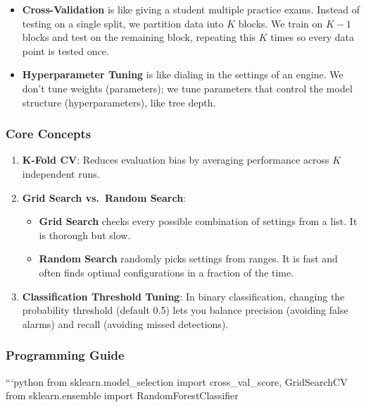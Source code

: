 \begin{itemize}
\tightlist
\item
  \textbf{Cross-Validation} is like giving a student multiple practice
  exams. Instead of testing on a single split, we partition data into
  \(K\) blocks. We train on \(K-1\) blocks and test on the remaining
  block, repeating this \(K\) times so every data point is tested once.
\item
  \textbf{Hyperparameter Tuning} is like dialing in the settings of an
  engine. We don't tune weights (parameters); we tune parameters that
  control the model structure (hyperparameters), like tree depth.
\end{itemize}

\subsubsection{Core Concepts}\label{core-concepts-4}

\begin{enumerate}
\def\labelenumi{\arabic{enumi}.}
\tightlist
\item
  \textbf{K-Fold CV}: Reduces evaluation bias by averaging performance
  across \(K\) independent runs.
\item
  \textbf{Grid Search vs.~Random Search}:

  \begin{itemize}
  \tightlist
  \item
    \textbf{Grid Search} checks every possible combination of settings
    from a list. It is thorough but slow.
  \item
    \textbf{Random Search} randomly picks settings from ranges. It is
    fast and often finds optimal configurations in a fraction of the
    time.
  \end{itemize}
\item
  \textbf{Classification Threshold Tuning}: In binary classification,
  changing the probability threshold (default 0.5) lets you balance
  precision (avoiding false alarms) and recall (avoiding missed
  detections).
\end{enumerate}

\subsubsection{Programming Guide}\label{programming-guide-8}

```python from sklearn.model\_selection import cross\_val\_score,
GridSearchCV from sklearn.ensemble import RandomForestClassifier

